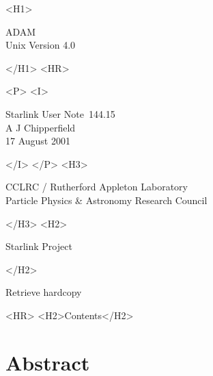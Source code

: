 \documentclass[twoside,11pt]{article}
\newcommand{\stardoccategory}  {Starlink User Note}
\newcommand{\stardocsource}    {sun\stardocnumber}
\newcommand{\stardocnumber}    {144.15}
\newcommand{\stardocauthors}   {A J Chipperfield}
\newcommand{\stardocdate}      {17 August 2001}
\newcommand{\stardoctitle}     {ADAM}
\newcommand{\stardocversion}   {Unix Version 4.0}
\newcommand{\stardocmanual}    {}
\newcommand{\htmladdnormallink}[2]{#1}
\newcommand{\htmladdimg}[1]{}
\newcommand{\htmlref}[2]{#1}
\newcommand{\htmladdtonavigation}[1]{}
\newcommand{\xlabel}[1]{}
\renewcommand{\_}{\texttt{\symbol{95}}}
\begin{document}
\begin{htmlonly}
   \xlabel{}
   \begin{rawhtml} <H1> \end{rawhtml}
      \stardoctitle\\
      \stardocversion\\
      \stardocmanual
   \begin{rawhtml} </H1> <HR> \end{rawhtml}


   \begin{rawhtml} <P> <I> \end{rawhtml}
   \stardoccategory\ \stardocnumber \\
   \stardocauthors \\
   \stardocdate
   \begin{rawhtml} </I> </P> <H3> \end{rawhtml}
      \htmladdnormallink{CCLRC / Rutherford Appleton Laboratory}
                        {http://www.cclrc.ac.uk} \\
      \htmladdnormallink{Particle Physics \& Astronomy Research Council}
                        {http://www.pparc.ac.uk} \\
   \begin{rawhtml} </H3> <H2> \end{rawhtml}
      \htmladdnormallink{Starlink Project}{http://www.starlink.ac.uk/}
   \begin{rawhtml} </H2> \end{rawhtml}
   \htmladdnormallink{\htmladdimg{source.gif} Retrieve hardcopy}
      {http://www.starlink.ac.uk/cgi-bin/hcserver?\stardocsource}\\

  \label{stardoccontents}
  \begin{rawhtml} 
    <HR>
    <H2>Contents</H2>
  \end{rawhtml}
  \htmladdtonavigation{\htmlref{\htmladdimg{contents_motif.gif}}
        {stardoccontents}}

  \section{\xlabel{abstract}Abstract}
\end{htmlonly}
\end{document}
